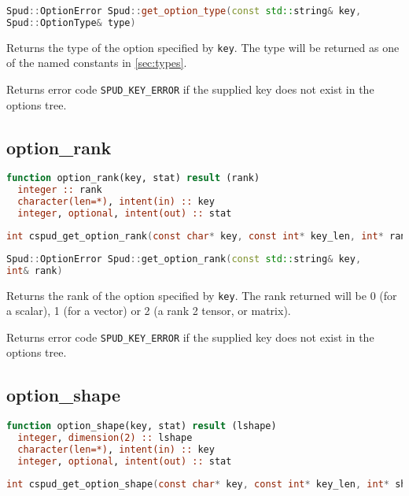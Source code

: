 \documentclass[a4paper, 11pt]{book}
\begin{document}
\begin{lstlisting}[language=C++]
Spud::OptionError Spud::get_option_type(const std::string& key,
Spud::OptionType& type)
\end{lstlisting}

Returns the type of the option specified by \lstinline+key+. The type will
be returned as one of the named constants in \ref{sec:types}.

Returns error code \lstinline+SPUD_KEY_ERROR+ if the supplied key does not
exist in the options tree.

\subsection{option\_rank}

\begin{lstlisting}[language=fortran]
function option_rank(key, stat) result (rank)
  integer :: rank
  character(len=*), intent(in) :: key
  integer, optional, intent(out) :: stat
\end{lstlisting}

\begin{lstlisting}[language=C]
int cspud_get_option_rank(const char* key, const int* key_len, int* rank)
\end{lstlisting}

\begin{lstlisting}[language=C++]
Spud::OptionError Spud::get_option_rank(const std::string& key,
int& rank)
\end{lstlisting}

Returns the rank of the option specified by \lstinline+key+. The rank returned
will be 0 (for a scalar), 1 (for a vector) or 2 (a rank 2 tensor, or matrix).

Returns error code \lstinline+SPUD_KEY_ERROR+ if the supplied key does not
exist in the options tree.

\subsection{option\_shape}

\begin{lstlisting}[language=fortran]
function option_shape(key, stat) result (lshape)
  integer, dimension(2) :: lshape
  character(len=*), intent(in) :: key
  integer, optional, intent(out) :: stat
\end{lstlisting}

\begin{lstlisting}[language=C]
int cspud_get_option_shape(const char* key, const int* key_len, int* shape)
\end{lstlisting}
\end{document}
